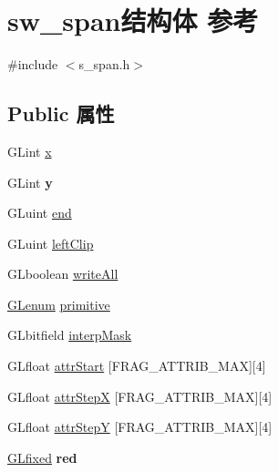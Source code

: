 \hypertarget{structsw__span}{}\section{sw\+\_\+span结构体 参考}
\label{structsw__span}


{\ttfamily \#include $<$s\+\_\+span.\+h$>$}

\subsection*{Public 属性}
\begin{DoxyCompactItemize}
\item 
G\+Lint \hyperlink{structsw__span_ab0470c3cea55cd9a25c9afa66ea282f8}{x}
\item 
\mbox{\label{structsw__span_ab88ef8892431240592908384f9e2018a}} 
G\+Lint {\bfseries y}
\item 
G\+Luint \hyperlink{structsw__span_a8762d6f687eccea08a9392ce7300f725}{end}
\item 
G\+Luint \hyperlink{structsw__span_ae07b7e3b7b05ad280c65cd9c56a79d94}{left\+Clip}
\item 
G\+Lboolean \hyperlink{structsw__span_a45786c94bddf28dc8fba6c23d66117d2}{write\+All}
\item 
\hyperlink{interfacevoid}{G\+Lenum} \hyperlink{structsw__span_ad52165048b6c688e607157dae554a8a4}{primitive}
\item 
G\+Lbitfield \hyperlink{structsw__span_ab88b4f60858ee7370048120ae672b488}{interp\+Mask}
\item 
G\+Lfloat \hyperlink{structsw__span_ad5f24a447e02e859c3bb74aad5fa2cc1}{attr\+Start} \mbox{[}F\+R\+A\+G\+\_\+\+A\+T\+T\+R\+I\+B\+\_\+\+M\+AX\mbox{]}\mbox{[}4\mbox{]}
\item 
G\+Lfloat \hyperlink{structsw__span_a57d4694fd1017135a5b96b3a91dfb8b9}{attr\+StepX} \mbox{[}F\+R\+A\+G\+\_\+\+A\+T\+T\+R\+I\+B\+\_\+\+M\+AX\mbox{]}\mbox{[}4\mbox{]}
\item 
G\+Lfloat \hyperlink{structsw__span_acf5f0b969e0de41f4d9c000704c3629b}{attr\+StepY} \mbox{[}F\+R\+A\+G\+\_\+\+A\+T\+T\+R\+I\+B\+\_\+\+M\+AX\mbox{]}\mbox{[}4\mbox{]}
\item 
\mbox{\label{structsw__span_a1bea0778ec8f044c0a1f7762ef4893de}} 
\hyperlink{glheader_8h_ad6d3fa892df40dedf48ee6d84529ae5e}{G\+Lfixed} {\bfseries red}
\item 
\mbox{\label{structsw__span_a2c38648dfc8b40fdae91b0e876d11164}} 

\end{DoxyCompactItemize}
